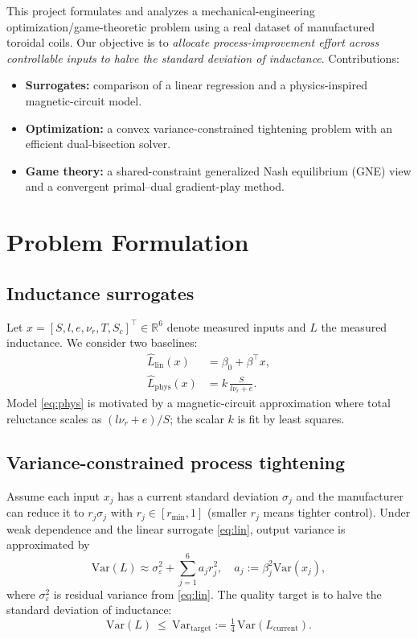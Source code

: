 \documentclass[conference]{IEEEtran}
\begin{document}
This project formulates and analyzes a mechanical-engineering optimization/game-theoretic problem using a real dataset of manufactured toroidal coils. Our objective is to \emph{allocate process-improvement effort across controllable inputs to halve the standard deviation of inductance}. Contributions:
\begin{itemize}
  \item \textbf{Surrogates:} comparison of a linear regression and a physics-inspired magnetic-circuit model.
  \item \textbf{Optimization:} a convex variance-constrained tightening problem with an efficient dual-bisection solver.
  \item \textbf{Game theory:} a shared-constraint generalized Nash equilibrium (GNE) view and a convergent primal--dual gradient-play method.
\end{itemize}

\section{Problem Formulation}
\subsection{Inductance surrogates}
Let $x=[S,l,e,\nu_r,T,S_c]^\top\in\mathbb{R}^6$ denote measured inputs and $L$ the measured inductance.
We consider two baselines:
\begin{align}
\hat L_{\text{lin}}(x) &= \beta_0 + \beta^\top x, \label{eq:lin}\\
\hat L_{\text{phys}}(x) &= k\,\frac{S}{l\nu_r+e}. \label{eq:phys}
\end{align}
Model \eqref{eq:phys} is motivated by a magnetic-circuit approximation where total reluctance scales as $(l\nu_r+e)/S$; the scalar $k$ is fit by least squares.

\subsection{Variance-constrained process tightening}
Assume each input $x_j$ has a current standard deviation $\sigma_j$ and the manufacturer can reduce it to $r_j\sigma_j$ with $r_j\in[r_{\min},1]$ (smaller $r_j$ means tighter control). Under weak dependence and the linear surrogate \eqref{eq:lin}, output variance is approximated by
\begin{equation}
\mathrm{Var}(L)\approx \sigma_\varepsilon^2 + \sum_{j=1}^6 a_j r_j^2, 
\quad a_j:=\beta_j^2\mathrm{Var}(x_j),
\label{eq:varprop}
\end{equation}
where $\sigma_\varepsilon^2$ is residual variance from \eqref{eq:lin}. The quality target is to halve the standard deviation of inductance:
\begin{equation}
\mathrm{Var}(L)\ \le\ \mathrm{Var}_{\text{target}} := \tfrac14\,\mathrm{Var}(L_{\text{current}}).
\end{equation}
\end{document}
